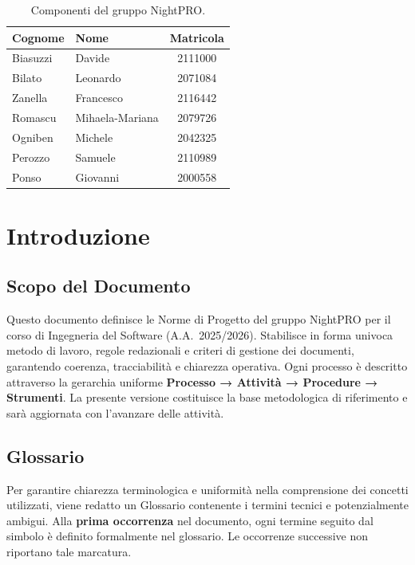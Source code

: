 \documentclass[a4paper, 11pt, oneside]{scrartcl}
\begin{document}
\begin{table}[h!]
    \centering
    \renewcommand{\arraystretch}{1.2}
    \begin{tabular}{@{}llc@{}}
        \toprule
        \textbf{Cognome} & \textbf{Nome}   & \textbf{Matricola} \\
        \midrule
        Biasuzzi         & Davide          & 2111000            \\
        Bilato           & Leonardo        & 2071084            \\
        Zanella          & Francesco       & 2116442            \\
        Romascu          & Mihaela-Mariana & 2079726            \\
        Ogniben          & Michele         & 2042325            \\
        Perozzo          & Samuele         & 2110989            \\
        Ponso            & Giovanni        & 2000558            \\
        \bottomrule
    \end{tabular}
    \caption{Componenti del gruppo NightPRO.}
\end{table}

\newpage
\section{Introduzione}
\label{sec:introduzione}

\subsection{Scopo del Documento}
Questo documento definisce le Norme di Progetto{\scriptsize{}} del gruppo NightPRO per il corso di Ingegneria del Software (A.A.~2025/2026).
Stabilisce in forma univoca metodo di lavoro, regole redazionali e criteri di gestione dei documenti, garantendo coerenza, tracciabilità e chiarezza operativa.
Ogni processo è descritto attraverso la gerarchia uniforme \textbf{Processo → Attività → Procedure → Strumenti}.
La presente versione costituisce la base metodologica di riferimento e sarà aggiornata con l'avanzare delle attività.

\subsection{Glossario}
Per garantire chiarezza terminologica e uniformità nella comprensione dei concetti utilizzati, viene redatto un Glossario{\scriptsize{}} contenente i termini tecnici e potenzialmente ambigui.
Alla \textbf{prima occorrenza} nel documento, ogni termine seguito dal simbolo {\scriptsize{}} è definito formalmente nel glossario.
Le occorrenze successive non riportano tale marcatura.
\end{document}

